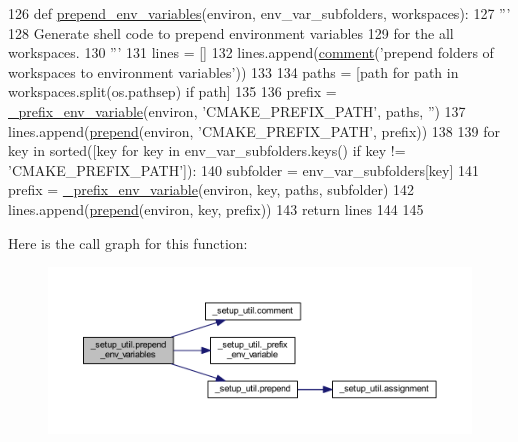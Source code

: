 \begin{DoxyCode}
126 \textcolor{keyword}{def }\hyperlink{namespace__setup__util_a832417d18b85bd1d276a87547e86f860}{prepend\_env\_variables}(environ, env\_var\_subfolders, workspaces):
127     \textcolor{stringliteral}{'''}
128 \textcolor{stringliteral}{    Generate shell code to prepend environment variables}
129 \textcolor{stringliteral}{    for the all workspaces.}
130 \textcolor{stringliteral}{    '''}
131     lines = []
132     lines.append(\hyperlink{namespace__setup__util_abe8c95c4cfe8b1374dacd5f91d984353}{comment}(\textcolor{stringliteral}{'prepend folders of workspaces to environment variables'}))
133 
134     paths = [path \textcolor{keywordflow}{for} path \textcolor{keywordflow}{in} workspaces.split(os.pathsep) \textcolor{keywordflow}{if} path]
135 
136     prefix = \hyperlink{namespace__setup__util_a01264d729d05078ec7ee1cad54fe6489}{\_prefix\_env\_variable}(environ, \textcolor{stringliteral}{'CMAKE\_PREFIX\_PATH'}, paths, \textcolor{stringliteral}{''})
137     lines.append(\hyperlink{namespace__setup__util_ae78d86b2c4279f5b8b1acaa146c35802}{prepend}(environ, \textcolor{stringliteral}{'CMAKE\_PREFIX\_PATH'}, prefix))
138 
139     \textcolor{keywordflow}{for} key \textcolor{keywordflow}{in} sorted([key \textcolor{keywordflow}{for} key \textcolor{keywordflow}{in} env\_var\_subfolders.keys() \textcolor{keywordflow}{if} key != \textcolor{stringliteral}{'CMAKE\_PREFIX\_PATH'}]):
140         subfolder = env\_var\_subfolders[key]
141         prefix = \hyperlink{namespace__setup__util_a01264d729d05078ec7ee1cad54fe6489}{\_prefix\_env\_variable}(environ, key, paths, subfolder)
142         lines.append(\hyperlink{namespace__setup__util_ae78d86b2c4279f5b8b1acaa146c35802}{prepend}(environ, key, prefix))
143     \textcolor{keywordflow}{return} lines
144 
145 
\end{DoxyCode}


Here is the call graph for this function\+:
\nopagebreak
\begin{figure}[H]
\begin{center}
\leavevmode
\includegraphics[width=350pt]{df/dc0/namespace__setup__util_a832417d18b85bd1d276a87547e86f860_cgraph}
\end{center}
\end{figure}


